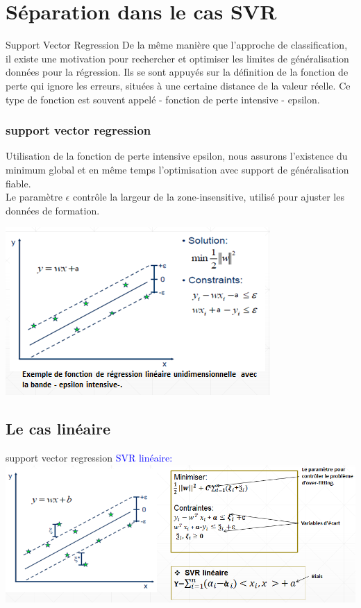 \documentclass{bredelebeamer}
\begin{document}
 
 \section{Séparation dans le cas SVR}
  \begin{frame}{Support Vector Regression}
  De la même manière que l'approche de classification, il existe une motivation pour rechercher et optimiser les limites de généralisation données pour la régression. Ils se sont appuyés sur la définition de la fonction de perte qui ignore les erreurs, situées à une certaine distance de la valeur réelle. Ce type de fonction est souvent appelé - fonction de perte intensive - epsilon.\vspace{1\baselineskip}\\
   \frametitle{support vector regression }
\begin{minipage}{0.3\textwidth}
Utilisation de la fonction de perte intensive epsilon, nous assurons l'existence du minimum global et en  même temps l'optimisation avec support de généralisation fiable.\vspace{1\baselineskip}\\
 Le paramètre $\epsilon$ contrôle la largeur de la zone-insensitive, utilisé pour ajuster les données de formation.

\end{minipage}
    \begin{minipage}{0.3\textwidth}
    \includegraphics[scale=0.7]{24.png}
    \end{minipage}
 \end{frame}
 
 
 \subsection{Le cas linéaire}
   \begin{frame}{support vector regression}
   \textcolor{blue}{SVR linéaire:}\vspace{1\baselineskip}\\
            \includegraphics[scale=0.45]{25.png}

 \end{frame}
\end{document}
